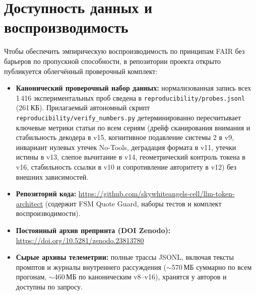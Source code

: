 \documentclass[11pt,a4paper]{article}
\begin{document}
\section{Доступность данных и воспроизводимость}

Чтобы обеспечить эмпирическую воспроизводимость по принципам FAIR без барьеров по пропускной способности, в репозитории проекта открыто публикуется облегчённый проверочный комплект:
\begin{itemize}
    \item \textbf{Канонический проверочный набор данных:} нормализованная запись всех 1\,416 экспериментальных проб сведена в \texttt{reproducibility/probes.jsonl} (261\,КБ). Прилагаемый автономный скрипт \texttt{reproducibility/verify\_numbers.py} детерминированно пересчитывает ключевые метрики статьи по всем сериям (дрейф сканирования внимания и стабильность декодера в v15, когнитивное подавление системы 2 в v9, инвариант нулевых утечек No-Tools, деградация формата в v11, утечки истины в v13, слепое вычитание в v14, геометрический контроль токена в v16, стабильность ссылки в v10 и сопротивление авторитету в v12) без внешних зависимостей.
    \item \textbf{Репозиторий кода:} \url{https://github.com/skywhiteangels-cell/llm-token-architect} (содержит FSM Quote Guard, наборы тестов и комплект воспроизводимости).
    \item \textbf{Постоянный архив препринта (DOI Zenodo):} \url{https://doi.org/10.5281/zenodo.23813780}
    \item \textbf{Сырые архивы телеметрии:} полные трассы JSONL, включая тексты промптов и журналы внутреннего рассуждения ($\sim$570\,МБ суммарно по всем прогонам, $\sim$460\,МБ по каноническим v8--v16), хранятся у авторов и доступны по запросу.
\end{itemize}



\end{document}
